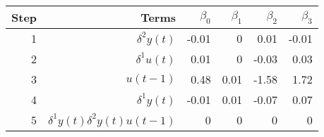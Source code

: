 \begin{tabular}{rrrrrr}
Step & Terms & $\beta_{0}$ & $\beta_{1}$ & $\beta_{2}$ & $\beta_{3}$ \\ 
\hline 
1 & $\delta^2 y(t)$ & -0.01 & 0 & 0.01 & -0.01 \\ 
2 & $\delta^1 u(t)$ & 0.01 & 0 & -0.03 & 0.03 \\ 
3 & $u(t-1)$ & 0.48 & 0.01 & -1.58 & 1.72 \\ 
4 & $\delta^1 y(t)$ & -0.01 & 0.01 & -0.07 & 0.07 \\ 
5 & $\delta^1 y(t)\delta^2 y(t)u(t-1)$ & 0 & 0 & 0 & 0 \\ 
\hline 
\end{tabular}